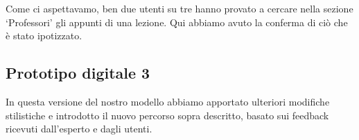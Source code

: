 Come ci aspettavamo, ben due utenti su tre hanno provato a cercare nella sezione ‘Professori’ gli appunti di una lezione. Qui abbiamo avuto la conferma di ciò che è stato ipotizzato.

\subsection{Prototipo digitale 3}
In questa versione del nostro modello abbiamo apportato ulteriori modifiche stilistiche e introdotto il nuovo percorso sopra descritto, basato sui feedback ricevuti dall’esperto e dagli utenti.